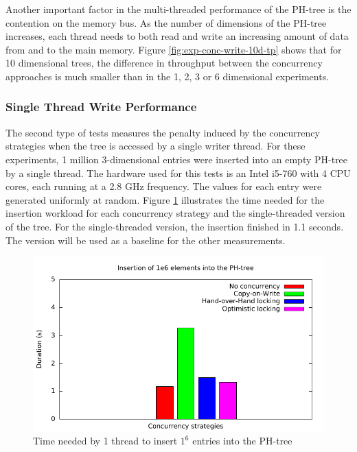 \documentclass[11pt,a4paper]{globis-book}
\begin{document}
Another important factor in the multi-threaded performance of the PH-tree is the contention on the memory bus. As the number of dimensions of the PH-tree increases, each thread needs to both read and write an increasing amount of data from and to the main memory. Figure \ref{fig:exp-conc-write-10d-tp} shows that for 10 dimensional trees, the difference in throughput between the concurrency approaches is much smaller than in the 1, 2, 3 or 6 dimensional experiments. 

\subsubsection{Single Thread Write Performance}

The second type of tests measures the penalty induced by the concurrency strategies when the tree is accessed by a single writer thread. For these experiments, 1 million 3-dimensional entries were inserted into an empty PH-tree by a single thread. The hardware used for this tests is an Intel i5-760 with 4 CPU cores, each running at a 2.8 GHz frequency. The values for each entry were generated uniformly at random. Figure \ref{fig:concurrent-comp} illustrates the time needed for the insertion workload for each concurrency strategy and the single-threaded version of the tree. For the single-threaded version, the insertion finished in 1.1 seconds. The version will be used as a baseline for the other measurements.  

\begin{figure}[h]
    \centering 
    \includegraphics[scale=1]{images/plots/concurrent-comp}
    \caption{Time needed by 1 thread to insert $1^6$ entries into the PH-tree}
    \label{fig:concurrent-comp}
\end{figure}
\end{document}
